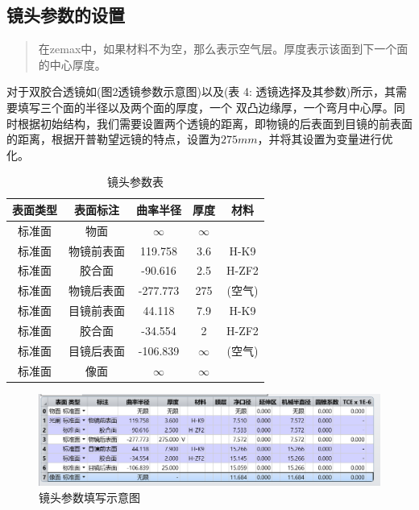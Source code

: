 \documentclass{article}
\begin{document}
\subsection{镜头参数的设置}
\begin{quote}
{\qquad{}\ccwd\kaishu{}
在zemax中，如果材料不为空，那么表示空气层。厚度表示该面到下一个面的中心厚度。
}
\end{quote}
对于双胶合透镜如(图2透镜参数示意图)以及(表 4: 透镜选择及其参数)所示，其需要填写三个面的半径以及两个面的厚度，一个
双凸边缘厚，一个弯月中心厚。同时根据初始结构，我们需要设置两个透镜的距离，即物镜的后表面到目镜的前表面的距离，根据开普勒望远镜的特点，设置为$275mm$，并将其设置为变量进行优化。
% 
\begin{table}[H]
  \centering
  \begin{tabular}{ccccc}
  \hline
  表面类型&表面标注&曲率半径&厚度&材料\\ \hline
  标准面	&	物面&$\infty$&$\infty$&\\ 
  标准面	&物镜前表面	&119.758	&3.6& H-K9\\ 
  标准面	&胶合面	&-90.616	&2.5&	H-ZF2\\ 
  标准面	&物镜后表面	&-277.773	&275& (空气)\\ 
  标准面	&目镜前表面	&44.118&7.9&H-K9\\ 
  标准面	&胶合面	&-34.554&2&H-ZF2\\ 
  标准面	&目镜后表面	&-106.839&$\infty$&(空气)\\ 
  标准面	&	像面&$\infty$&$\infty$&\\ \hline

  

\end{tabular}
  \caption{镜头参数表}
  \end{table}
          \begin{figure}[H]
              \centering
              \includegraphics[width=18cm]{img/5.png}
  \caption{镜头参数填写示意图}
              \end{figure}
  \begin{quote}
  \end{quote}
\end{document}

